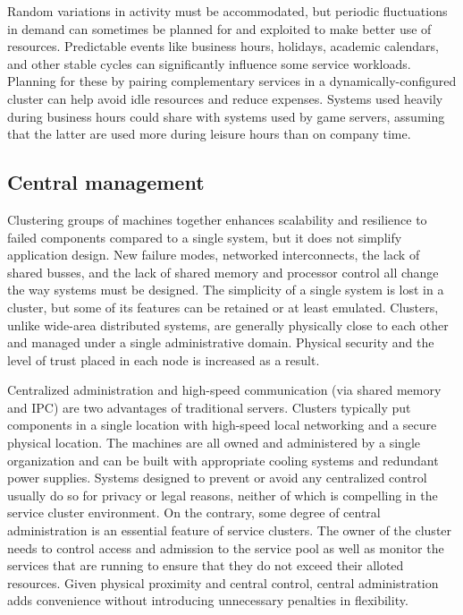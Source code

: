Random variations in activity must be accommodated, but periodic fluctuations in demand can sometimes be planned for and exploited to make better use of resources. Predictable events like business hours, holidays, academic calendars, and other stable cycles can significantly influence some service workloads. Planning for these by pairing complementary services in a dynamically-configured cluster can help avoid idle resources and reduce expenses. Systems used heavily during business hours could share with systems used by game servers, assuming that the latter are used more during leisure hours than on company time.

\subsection{Central management}

Clustering groups of machines together enhances scalability and resilience to failed components compared to a single system, but it does not simplify application design. New failure modes, networked interconnects, the lack of shared busses, and the lack of shared memory and processor control all change the way systems must be designed. The simplicity of a single system is lost in a cluster, but some of its features can be retained or at least emulated. Clusters, unlike wide-area distributed systems, are generally physically close to each other and managed under a single administrative domain. Physical security and the level of trust placed in each node is increased as a result.

Centralized administration and high-speed communication (via shared memory and IPC) are two advantages of traditional servers. Clusters typically put components in a single location with high-speed local networking and a secure physical location. The machines are all owned and administered by a single organization and can be built with appropriate cooling systems and redundant power supplies. Systems designed to prevent or avoid any centralized control usually do so for privacy or legal reasons, neither of which is compelling in the service cluster environment. On the contrary, some degree of central administration is an essential feature of service clusters. The owner of the cluster needs to control access and admission to the service pool as well as monitor the services that are running to ensure that they do not exceed their alloted resources. Given physical proximity and central control, central administration adds convenience without introducing unnecessary penalties in flexibility.

